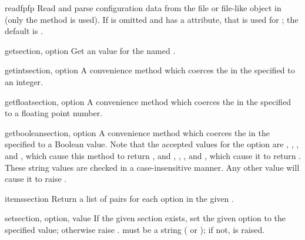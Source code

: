 \begin{methoddesc}{readfp}{fp}
Read and parse configuration data from the file or file-like object in
 (only the  method is used).  If
 is omitted and  has a  attribute,
that is used for ; the default is .
\end{methoddesc}

\begin{methoddesc}{get}{section, option}
Get an  value for the named .
\end{methoddesc}

\begin{methoddesc}{getint}{section, option}
A convenience method which coerces the  in the specified
 to an integer.
\end{methoddesc}

\begin{methoddesc}{getfloat}{section, option}
A convenience method which coerces the  in the specified
 to a floating point number.
\end{methoddesc}

\begin{methoddesc}{getboolean}{section, option}
A convenience method which coerces the  in the specified
 to a Boolean value.  Note that the accepted values
for the option are , , , and ,
which cause this method to return , and , ,
, and , which cause it to return .  These
string values are checked in a case-insensitive manner.  Any other value will
cause it to raise .
\end{methoddesc}

\begin{methoddesc}{items}{section}
Return a list of  pairs for each
option in the given .
\end{methoddesc}

\begin{methoddesc}{set}{section, option, value}
If the given section exists, set the given option to the specified value;
otherwise raise .   must be a
string ( or ); if not, 
is raised.
\end{methoddesc}

